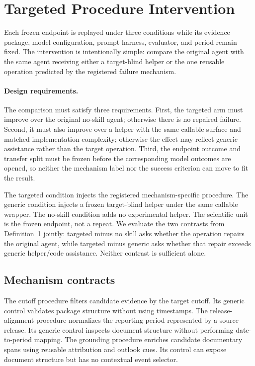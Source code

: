 \section{Targeted Procedure Intervention}
\label{sec:intervention}
Each frozen endpoint is replayed under three conditions while its evidence package, model configuration, prompt harness, evaluator, and period remain fixed. The intervention is intentionally simple: compare the original agent with the same agent receiving either a target-blind helper or the one reusable operation predicted by the registered failure mechanism.

\paragraph{Design requirements.}
The comparison must satisfy three requirements. First, the targeted arm must improve over the original no-skill agent; otherwise there is no repaired failure. Second, it must also improve over a helper with the same callable surface and matched implementation complexity; otherwise the effect may reflect generic assistance rather than the target operation. Third, the endpoint outcome and transfer split must be frozen before the corresponding model outcomes are opened, so neither the mechanism label nor the success criterion can move to fit the result.

The targeted condition injects the registered mechanism-specific procedure. The generic condition injects a frozen target-blind helper under the same callable wrapper. The no-skill condition adds no experimental helper. The scientific unit is the frozen endpoint, not a repeat. We evaluate the two contrasts from Definition~1 jointly: targeted minus no skill asks whether the operation repairs the original agent, while targeted minus generic asks whether that repair exceeds generic helper/code assistance. Neither contrast is sufficient alone.

\subsection{Mechanism contracts}
The cutoff procedure filters candidate evidence by the target cutoff. Its generic control validates package structure without using timestamps. The release-alignment procedure normalizes the reporting period represented by a source release. Its generic control inspects document structure without performing date-to-period mapping. The grounding procedure enriches candidate documentary spans using reusable attribution and outlook cues. Its control can expose document structure but has no contextual event selector.

